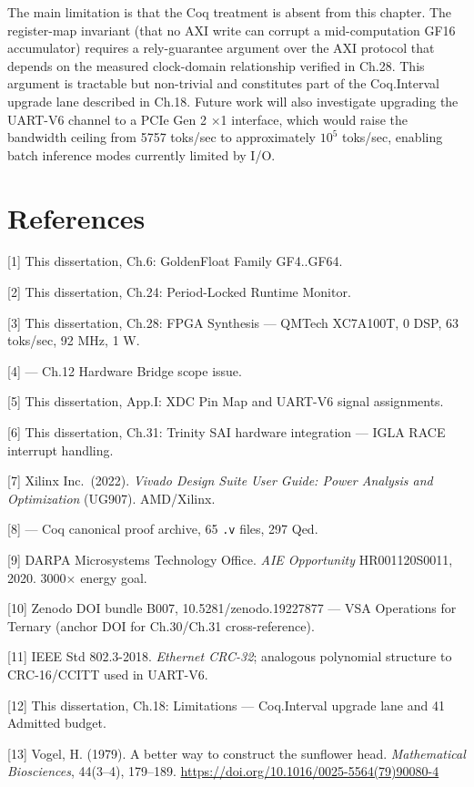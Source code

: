 The main limitation is that the Coq treatment is
absent from this chapter. The register-map
invariant (that no AXI write can corrupt a
mid-computation GF16 accumulator) requires a
rely-guarantee argument over the AXI protocol that
depends on the measured clock-domain relationship
verified in Ch.28. This argument is tractable but
non-trivial and constitutes part of the
Coq.Interval upgrade lane described in Ch.18.
Future work will also investigate upgrading the
UART-V6 channel to a PCIe Gen 2 $\times$1 interface,
which would raise the bandwidth ceiling from 5757
toks/sec to approximately \(10^5\) toks/sec,
enabling batch inference modes currently limited
by I/O.

\section{References}\label{fa_12:references}

[1] This dissertation, Ch.6: GoldenFloat
Family GF4..GF64.

[2] This dissertation, Ch.24: Period-Locked
Runtime Monitor.

[3] This dissertation, Ch.28: FPGA Synthesis
--- QMTech XC7A100T, 0 DSP, 63 toks/sec, 92 MHz, 1
W.

[4]  --- Ch.12
Hardware Bridge scope issue.

[5] This dissertation, App.I: XDC Pin Map and
UART-V6 signal assignments.

[6] This dissertation, Ch.31: Trinity SAI
hardware integration --- IGLA RACE interrupt
handling.

[7] Xilinx Inc.~(2022). \emph{Vivado Design
Suite User Guide: Power Analysis and Optimization}
(UG907). AMD/Xilinx.

[8] 
--- Coq canonical proof archive, 65 \texttt{.v}
files, 297 Qed.

[9] DARPA Microsystems Technology Office.
\emph{AIE Opportunity} HR001120S0011, 2020. 3000$\times$
energy goal.

[10] Zenodo DOI bundle B007,
10.5281/zenodo.19227877 --- VSA Operations for
Ternary (anchor DOI for Ch.30/Ch.31
cross-reference).

[11] IEEE Std 802.3-2018. \emph{Ethernet
CRC-32}; analogous polynomial structure to
CRC-16/CCITT used in UART-V6.

[12] This dissertation, Ch.18: Limitations ---
Coq.Interval upgrade lane and 41 Admitted budget.

[13] Vogel, H. (1979). A better way to
construct the sunflower head. \emph{Mathematical
Biosciences}, 44(3--4), 179--189.
\url{https://doi.org/10.1016/0025-5564(79)90080-4}

